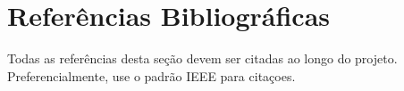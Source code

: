 \documentclass[a4paper,12pt]{article}
\begin{document}
\section*{Referências Bibliográficas}
Todas as referências desta seção devem ser citadas ao longo do projeto. Preferencialmente, use o padrão IEEE para citaçoes.




\end{document}
